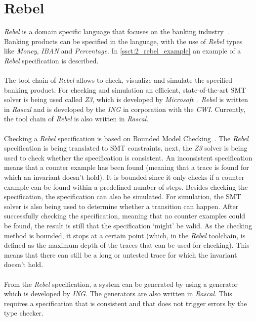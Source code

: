 \section{Rebel}
\label{sct:background_rebel}
\textit{Rebel} is a domain specific language that focuses on the banking
industry~\cite{stoel2016solving}. Banking products can be specified in the
language, with the use of \textit{Rebel} types like \textit{Money},
\textit{IBAN} and \textit{Percentage}. In \autoref{ssct:2_rebel_example} an
example of a \textit{Rebel} specification is described.\\
\\
The tool chain of \textit{Rebel} allows to check, visualize and simulate the specified
banking product. For checking and simulation an efficient, state-of-the-art SMT
solver is being used called \textit{Z3}, which is developed by
\textit{Microsoft}~\cite{de2008z3}. \textit{Rebel} is written in \textit{Rascal}
and is developed by the \textit{ING} in corporation with the \textit{CWI}.
Currently, the tool chain of \textit{Rebel} is also written in
\textit{Rascal}.\\
\\
Checking a \textit{Rebel} specification is based on Bounded Model
Checking~\cite{stoel2016solving}. The \textit{Rebel} specification is being
translated to SMT constraints, next, the \textit{Z3} solver is being used to
check whether the specification is consistent. An inconsistent specification
means that a counter example has been found (meaning that a trace is found for which an
invariant doesn't hold). It is bounded since it only checks if a counter example
can be found within a predefined number of steps. Besides checking the
specification, the specification can also be simulated. For simulation, the SMT
solver is also being used to determine whether a transition can happen. After
successfully checking the specification, meaning that no counter examples could
be found, the result is still that the specification `might' be valid. As the
checking method is bounded, it stops at a certain point (which, in the
\textit{Rebel} toolchain, is defined as the maximum depth of the traces that can
be used for checking). This means that there can still be a long or untested
trace for which the invariant doesn't hold.\\
\\
From the \textit{Rebel} specification, a system can be generated by using a
generator which is developed by \textit{ING}. The generators are also written in
\textit{Rascal}. This requires a specification that is consistent and that does
not trigger errors by the type checker.

